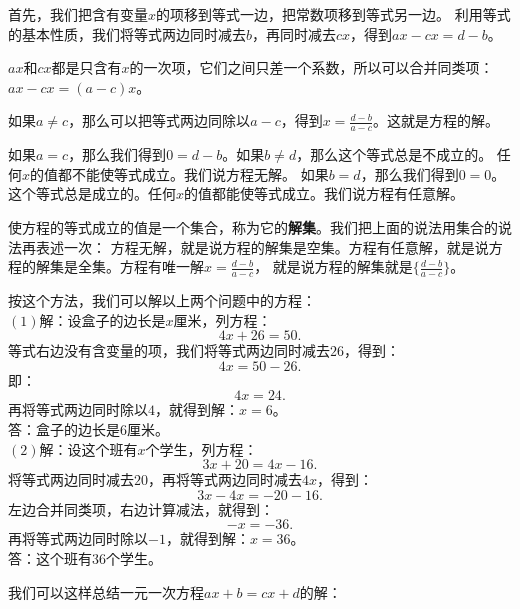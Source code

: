 \documentclass[12pt,UTF8,fontset=none]{ctexbook}
\begin{document}
首先，我们把含有变量$x$的项移到等式一边，把常数项移到等式另一边。
利用等式的基本性质，我们将等式两边同时减去$b$，再同时减去$cx$，得到$ax-cx=d-b$。

$ax$和$cx$都是只含有$x$的一次项，它们之间只差一个系数，所以可以合并同类项：$ax - cx = (a - c)x$。

如果$a\neq c$，那么可以把等式两边同除以$a-c$，得到$x = \frac{d-b}{a-c}$。这就是方程的解。

如果$a = c$，那么我们得到$0 = d-b$。如果$b\neq d$，那么这个等式总是不成立的。
任何$x$的值都不能使等式成立。我们说方程无解。
如果$b = d$，那么我们得到$0 = 0$。这个等式总是成立的。任何$x$的值都能使等式成立。我们说方程有任意解。

使方程的等式成立的值是一个集合，称为它的\textbf{解集}。我们把上面的说法用集合的说法再表述一次：
方程无解，就是说方程的解集是空集。方程有任意解，就是说方程的解集是全集。方程有唯一解$x = \frac{d-b}{a-c}$，
就是说方程的解集就是$\{\frac{d-b}{a-c}\}$。
\begin{so}
    按这个方法，我们可以解以上两个问题中的方程：\\
    $(1)$解：设盒子的边长是$x$厘米，列方程：
    $$ 4x + 26 = 50.$$
    等式右边没有含变量的项，我们将等式两边同时减去$26$，得到：
    $$ 4x = 50 - 26.$$
    即：
    $$ 4x = 24. $$
    再将等式两边同时除以$4$，就得到解：$x=6$。\\
    答：盒子的边长是$6$厘米。\\
    $(2)$解：设这个班有$x$个学生，列方程：
    $$ 3x + 20 = 4x - 16.$$
    将等式两边同时减去$20$，再将等式两边同时减去$4x$，得到：
    $$ 3x - 4x = -20 - 16.$$
    左边合并同类项，右边计算减法，就得到：
    $$ -x = -36. $$
    再将等式两边同时除以$-1$，就得到解：$x = 36$。\\
    答：这个班有$36$个学生。
\end{so}
我们可以这样总结一元一次方程$ax+b=cx+d$的解：
\begin{center}
\end{center}
\end{document}
